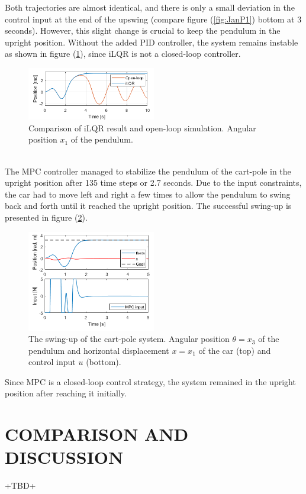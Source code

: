 \documentclass[letterpaper, 10 pt, conference]{ieeeconf}  %
\begin{document}
Both trajectories are almost identical, and there is only a small deviation in the control input at the end of the upswing (compare figure (\ref{fig:JanP1}) bottom at 3 seconds). However, this slight change is crucial to keep the pendulum in the upright position. Without the added PID controller, the system remains instable as shown in figure (\ref{fig:JanP2}), since iLQR is not a closed-loop controller.
\begin{figure}[htp] 
	\centering
	\includegraphics[width=0.5\textwidth]{P2.png}
	\caption{Comparison of iLQR result and open-loop simulation. Angular position $x_1$ of the pendulum.}
	\label{fig:JanP2}
\end{figure}\\

The MPC controller managed to stabilize the pendulum of the cart-pole in the upright position after 135 time steps or 2.7 seconds. Due to the input constraints, the car had to move left and right a few times to allow the pendulum to swing back and forth until it reached the upright position. The successful swing-up is presented in figure (\ref{fig:JanCP}). 
 \begin{figure}[htp] 
 	\centering
 	\includegraphics[width=0.5\textwidth]{CP.png}
 	\caption{The swing-up of the cart-pole system. Angular position $\theta=x_3$ of the pendulum and horizontal displacement $x=x_1$ of the car (top) and control input $u$ (bottom).}
 	\label{fig:JanCP}
 \end{figure}

Since MPC is a closed-loop control strategy, the system remained in the upright position after reaching it initially.

\section{COMPARISON AND DISCUSSION}
+TBD+
\end{document}
